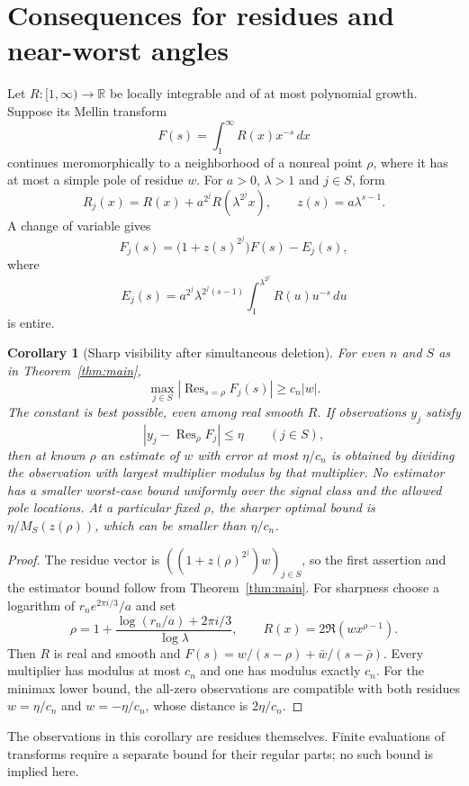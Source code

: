 \documentclass[11pt]{article}
\newtheorem{corollary}[theorem]{Corollary}
\newcommand{\R}{\mathbb R}
\newcommand{\Res}{\operatorname{Res}}
\begin{document}
\section{Consequences for residues and near-worst angles}

Let $R:[1,\infty)\to\R$ be locally integrable and of at most polynomial growth. Suppose its Mellin transform
\[
 F(s)=\int_1^\infty R(x)x^{-s}\,dx
\]
continues meromorphically to a neighborhood of a nonreal point $\rho$, where it has at most a simple pole of residue $w$. For $a>0$, $\lambda>1$ and $j\in S$, form
\[
 R_j(x)=R(x)+a^{2^j}R(\lambda^{2^j}x),\qquad z(s)=a\lambda^{s-1}.
\]
A change of variable gives
\[
 F_j(s)=\bigl(1+z(s)^{2^j}\bigr)F(s)-E_j(s),
\]
where
\[
 E_j(s)=a^{2^j}\lambda^{2^j(s-1)}
 \int_1^{\lambda^{2^j}}R(u)u^{-s}\,du
\]
is entire.

\begin{corollary}[Sharp visibility after simultaneous deletion]\label{cor:residue}
For even $n$ and $S$ as in Theorem~\ref{thm:main},
\[
 \max_{j\in S}|\Res_{s=\rho}F_j(s)|\ge c_n|w|.
\]
The constant is best possible, even among real smooth $R$.
If observations $y_j$ satisfy
\[
 |y_j-\Res_\rho F_j|\le\eta\qquad(j\in S),
\]
then at known $\rho$ an estimate of $w$ with error at most $\eta/c_n$ is obtained by dividing the observation with largest multiplier modulus by that multiplier. No estimator has a smaller worst-case bound uniformly over the signal class and the allowed pole locations. At a particular fixed $\rho$, the sharper optimal bound is $\eta/M_S(z(\rho))$, which can be smaller than $\eta/c_n$.
\end{corollary}

\begin{proof}
The residue vector is $((1+z(\rho)^{2^j})w)_{j\in S}$, so the first assertion and the estimator bound follow from Theorem~\ref{thm:main}. For sharpness choose a logarithm of $r_ne^{2\pi i/3}/a$ and set
\[
 \rho=1+\frac{\log(r_n/a)+2\pi i/3}{\log\lambda},\qquad
 R(x)=2\Re(w x^{\rho-1}).
\]
Then $R$ is real and smooth and $F(s)=w/(s-\rho)+\bar w/(s-\bar\rho)$. Every multiplier has modulus at most $c_n$ and one has modulus exactly $c_n$. For the minimax lower bound, the all-zero observations are compatible with both residues $w=\eta/c_n$ and $w=-\eta/c_n$, whose distance is $2\eta/c_n$.
\end{proof}

The observations in this corollary are residues themselves. Finite evaluations of transforms require a separate bound for their regular parts; no such bound is implied here.
\end{document}
